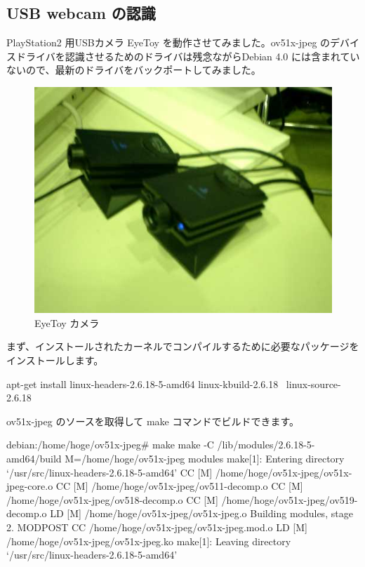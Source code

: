 \documentclass[mingoth,a4paper]{jsarticle}
\begin{document}
\subsection{USB webcam の認識}

PlayStation2 用USBカメラ EyeToy を動作させてみました。ov51x-jpeg のデバイ
スドライバを認識させるためのドライバは残念ながらDebian 4.0 には含まれてい
ないので、最新のドライバをバックポートしてみました。

\begin{figure}[H]
\begin{center}
  \includegraphics[width=0.5\hsize]{image200710/eyetoy.jpg}
\end{center}
\caption{EyeToy カメラ}
\label{eyetoy}
\end{figure}


まず、インストールされたカーネルでコンパイルするために必要なパッケージを
インストールします。

\begin{commandline}
apt-get install linux-headers-2.6.18-5-amd64 linux-kbuild-2.6.18 \
 linux-source-2.6.18
\end{commandline}

ov51x-jpeg のソースを取得して make コマンドでビルドできます。

\begin{commandline}
debian:/home/hoge/ov51x-jpeg# make 
make -C /lib/modules/2.6.18-5-amd64/build M=/home/hoge/ov51x-jpeg modules
make[1]: Entering directory `/usr/src/linux-headers-2.6.18-5-amd64'
  CC [M]  /home/hoge/ov51x-jpeg/ov51x-jpeg-core.o
  CC [M]  /home/hoge/ov51x-jpeg/ov511-decomp.o
  CC [M]  /home/hoge/ov51x-jpeg/ov518-decomp.o
  CC [M]  /home/hoge/ov51x-jpeg/ov519-decomp.o
  LD [M]  /home/hoge/ov51x-jpeg/ov51x-jpeg.o
  Building modules, stage 2.
  MODPOST
  CC      /home/hoge/ov51x-jpeg/ov51x-jpeg.mod.o
  LD [M]  /home/hoge/ov51x-jpeg/ov51x-jpeg.ko
make[1]: Leaving directory `/usr/src/linux-headers-2.6.18-5-amd64'
 
\end{commandline}
\end{document}
